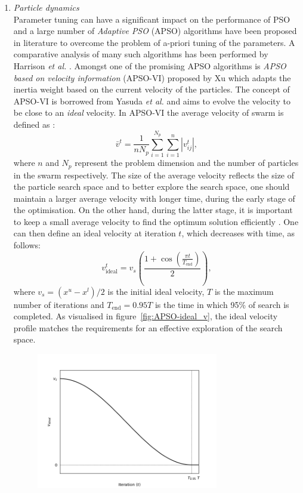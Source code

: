 \begin{enumerate}
		\item \emph{Particle dynamics}\\
			Parameter tuning can have a significant impact on the performance of PSO and a large number of \emph{Adaptive PSO} (APSO) algorithms have been proposed in literature to overcome the problem of a-priori tuning of the parameters. A comparative analysis of many such algorithms has been performed by Harrison \textit{et al.} \cite{Harrison:2018aa}. Amongst one of the promising APSO algorithms is \emph{APSO based on velocity information} (APSO-VI) proposed by Xu \cite{Xu:2013aa} which adapts the inertia weight based on the current velocity of the particles. The concept of APSO-VI is borrowed from Yasuda \textit{et al.} \cite{Yasuda:2008aa} and aims to evolve the velocity to be close to an \emph{ideal} velocity. In APSO-VI the average velocity of swarm is defined as \cite{Xu:2013aa}:
			\begin{equation}
				\bar{v}^t = \frac{1}{n N_p} \sum_{i=1}^{N_p} \sum_{i=1}^{n} \left | v_{ij}^t \right |,
			\end{equation}
			where $n$ and $N_p$ represent the problem dimension and the number of particles in the swarm respectively. The size of the average velocity reflects the size of the particle search space and to better explore the search space, one should maintain a larger average velocity with longer time, during the early stage of the optimisation. On the other hand, during the latter stage, it is important to keep a small average velocity to find the optimum solution efficiently \cite{Xu:2013aa}. One can then define an ideal velocity at iteration $t$, which decreases with time, as follows:
			\begin{equation}
				{v}_\text{ideal}^t = v_s \left(\frac{1 + \cos\left (\frac{\pi t}{T_\text{end}} \right )}{2} \right),
			\end{equation}
			where $v_s = (x^u - x^l) / 2$ is the initial ideal velocity, $T$ is the maximum number of iterations and $T_\text{end} = 0.95 T$ is the time in which 95\% of search is completed. As visualised in figure~\ref{fig:APSO-ideal_v}, the ideal velocity profile matches the requirements for an effective exploration of the search space.
			\begin{figure}[htbp]
				\centering
				\includegraphics[width=0.75\textwidth]{figures/chapter-6/APSO-VI}

\end{figure}
\end{enumerate}
